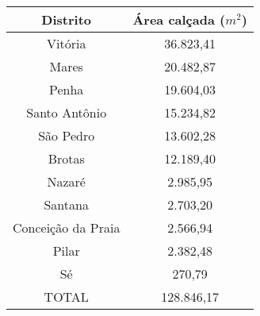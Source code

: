 \begin{table}[!htp]
\centering
{}
{\begin{tiny}
\begin{tabular}{cc}
\toprule
Distrito			&Área calçada ($m^{2}$)\\
\midrule \midrule
Vitória				&36.823,41\\
Mares				&20.482,87\\
Penha				&19.604,03\\
Santo Antônio		&15.234,82\\
São Pedro			&13.602,28\\
Brotas				&12.189,40\\
Nazaré				&2.985,95\\
Santana				&2.703,20\\
Conceição da Praia	&2.566,94\\
Pilar				&2.382,48\\
Sé					&270,79\\
\midrule
TOTAL				&128.846,17\\
\bottomrule
\end{tabular}
\end{tiny}
}
{}
\end{table}